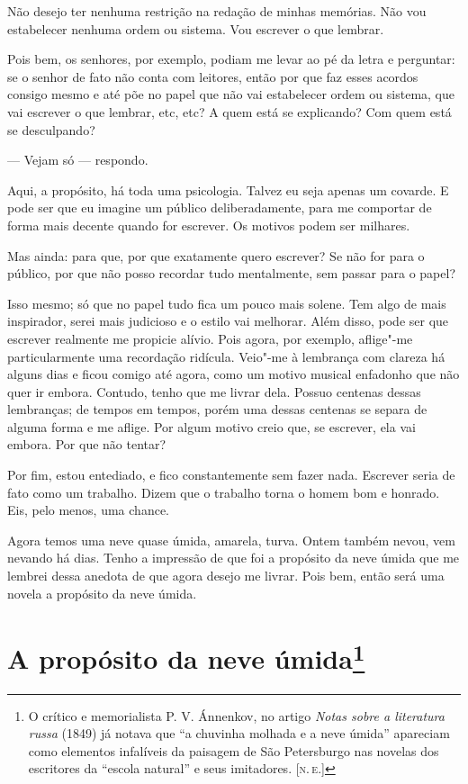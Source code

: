 Não desejo ter nenhuma restrição na redação de minhas memórias. Não vou
estabelecer nenhuma ordem ou sistema. Vou escrever o que lembrar.

Pois bem, os senhores, por exemplo, podiam me levar ao pé da letra e
perguntar: se o senhor de fato não conta com leitores, então por que faz
esses acordos consigo mesmo e até põe no papel que não vai estabelecer
ordem ou sistema, que vai escrever o que lembrar, etc, etc? A quem está
se explicando? Com quem está se desculpando?

--- Vejam só --- respondo.

Aqui, a propósito, há toda uma psicologia. Talvez eu seja apenas um
covarde. E pode ser que eu imagine um público deliberadamente, para me
comportar de forma mais decente quando for escrever. Os motivos podem
ser milhares.

Mas ainda: para que, por que exatamente quero escrever? Se não for para
o público, por que não posso recordar tudo mentalmente, sem passar para
o papel?

Isso mesmo; só que no papel tudo fica um pouco mais solene. Tem algo de
mais inspirador, serei mais judicioso e o estilo vai melhorar. Além
disso, pode ser que escrever realmente me propicie alívio. Pois agora,
por exemplo, aflige"-me particularmente uma recordação ridícula. Veio"-me
à lembrança com clareza há alguns dias e ficou comigo até agora, como um
motivo musical enfadonho que não quer ir embora. Contudo, tenho que me
livrar dela. Possuo centenas dessas lembranças; de tempos em tempos,
porém uma dessas centenas se separa de alguma forma e me aflige. Por
algum motivo creio que, se escrever, ela vai embora. Por que não tentar?

Por fim, estou entediado, e fico constantemente sem fazer nada. Escrever
seria de fato como um trabalho. Dizem que o trabalho torna o homem bom e
honrado. Eis, pelo menos, uma chance.

Agora temos uma neve quase úmida, amarela, turva. Ontem também nevou,
vem nevando há dias. Tenho a impressão de que foi a propósito da neve
úmida que me lembrei dessa anedota de que agora desejo me livrar. Pois
bem, então será uma novela a propósito da neve úmida.

\chapter{A propósito da neve úmida\footnote[*]{O crítico e memorialista
  P. V. Ánnenkov, no artigo \emph{Notas sobre a literatura russa} (1849)
  já notava que ``a chuvinha molhada e a neve úmida'' apareciam como
  elementos infalíveis da paisagem de São Petersburgo nas novelas dos
  escritores da ``escola natural'' e seus imitadores. {[}\textsc{n.\,e.}{]}}}


